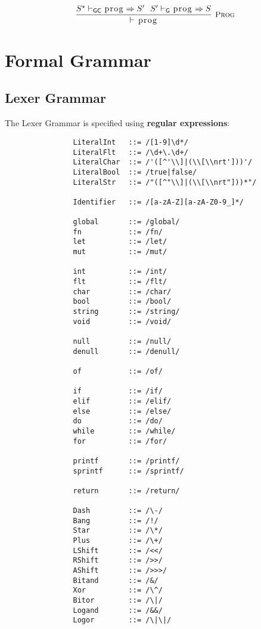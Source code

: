 \documentclass{article}
\newcommand{\code}[1]{\lstinline[columns=fixed]{#1}}
\newcommand{\drmrule}[5]{\frac{#1}{#2\vdash_{\mathsf{#3}}#4}\textsc{\ \small{#5}}}
\newcommand{\ruleapp}[1]{\vdash_{\mathsf{#1}}}
\newcommand{\mc}[1]{\textnormal{\code{#1}}}
\begin{document}
			\begin{align*}
				\drmrule{S^\star \ruleapp{GC} \mc{prog} \Rightarrow S' \ \ S' \ruleapp{G} \mc{prog} \Rightarrow S}{}{}{\mc{prog}}{Prog}
			\end{align*}
		
	\section{Formal Grammar}
	
		\subsection{Lexer Grammar}
		
			The Lexer Grammar is specified using \textbf{regular expressions}:
			
			\begin{verbatim}
				LiteralInt   ::= /[1-9]\d*/
				LiteralFlt   ::= /\d+\.\d+/
				LiteralChar  ::= /'([^'\\]|(\\[\\nrt']))'/
				LiteralBool  ::= /true|false/
				LiteralStr   ::= /"([^"\\]|(\\[\\nrt"]))*"/
				
				Identifier   ::= /[a-zA-Z][a-zA-Z0-9_]*/
				
				global       ::= /global/
				fn           ::= /fn/
				let          ::= /let/
				mut          ::= /mut/
				
				int          ::= /int/
				flt          ::= /flt/
				char         ::= /char/
				bool         ::= /bool/
				string       ::= /string/
				void         ::= /void/
				
				null         ::= /null/
				denull       ::= /denull/
				
				of           ::= /of/
				
				if           ::= /if/
				elif         ::= /elif/
				else         ::= /else/
				do           ::= /do/
				while        ::= /while/
				for          ::= /for/
				
				printf       ::= /printf/
				sprintf      ::= /sprintf/
				 
				return       ::= /return/
				
				Dash         ::= /\-/
				Bang         ::= /!/
				Star         ::= /\*/
				Plus         ::= /\+/
				LShift       ::= /<</
				RShift       ::= />>/
				AShift       ::= />>>/
				Bitand       ::= /&/
				Xor          ::= /\^/
				Bitor        ::= /\|/
				Logand       ::= /&&/
				Logor        ::= /\|\|/
				

\end{verbatim}
\end{document}
